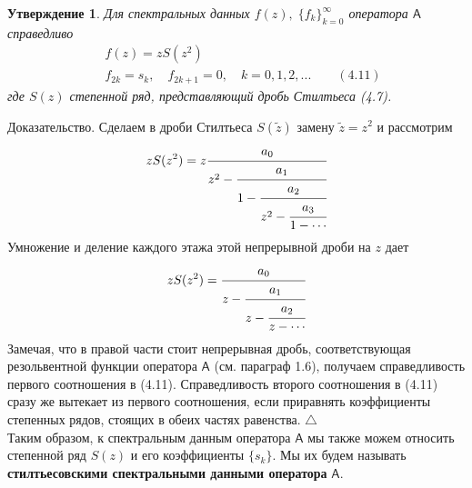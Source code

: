 \documentclass[12 pt, a4 paper]{article}
\theoremstyle{plain}   \newtheorem{Pro}{Задача}
\newtheorem{Sta}{Утверждение}
\begin{document}
\begin{Sta}
Для спектральных данных
$ f(z), \; \{ f_k \} _{k=0}^{\infty} $
оператора
$ \mathsf{A} $
справедливо
\begin{align*}
  \; & f(z)=zS(z^2 ) \\
  \; & f_{2k}=s_k , \quad f_{2k+1}=0, \quad
  k=0,1,2,... \qquad (4.11)
\end{align*}
где
$ S(z) $
степенной ряд, представляющий дробь Стилтьеса (4.7).
\end{Sta}
{\Large Доказательство.}
Сделаем в дроби Стилтьеса
$ S(\tilde z ) $
замену
$ \tilde z =z^2 $
и рассмотрим
\begin{equation*}
  zS(z^2 )=z
     \cfrac{a_0}{z^2 -
	   \cfrac{a_1}{1-
	     \cfrac{a_2}{z^2 -
		   \cfrac{a_3}{1-\dotsb
	  }}}}
\end{equation*}
Умножение и деление каждого этажа этой непрерывной дроби на
$ z $
дает
\begin{equation*}
  zS(z^2 )=
    \cfrac{a_0}{z-
	  \cfrac{a_1}{z-
	    \cfrac{a_2}{z-\dotsb
	}}}
\end{equation*}
Замечая, что в правой части стоит непрерывная дробь,
соответствующая резольвентной функции оператора
$ \mathsf{A} $
(см. параграф 1.6), получаем справедливость первого
соотношения в (4.11). Справедливость второго соотношения
в (4.11) сразу же вытекает из первого соотношения,
если приравнять коэффициенты степенных рядов,
стоящих в обеих частях равенства.
$ \triangle $ \\
Таким образом, к спектральным данным оператора
$ \mathsf{A} $
мы также можем относить степенной ряд
$ S(z) $
и его коэффициенты
$ \{ s_k \} . $
Мы их будем называть
{\bfseries стилтьесовскими спектральными данными оператора}
$ \mathsf{A}. $
\newpage
\end{document}
